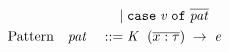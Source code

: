 \begin{displaymath}
\begin{aligned}
    && && \; | \; & \texttt{case}\; \mathit{v} \;\texttt{of}\;\overline{\mathit{pat}} \\
    \textup{Pattern} && \mathit{pat} && \; ::= \; &
    \mathit{K} \; \;(\overline{x : \mathit{\tau}}) \;\rightarrow \;\mathit{e} \\
  \end{aligned}
\end{displaymath}
